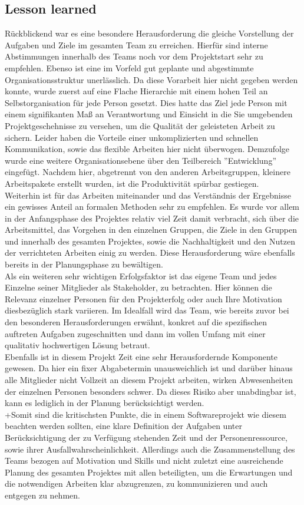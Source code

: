 \documentclass[12pt,a4paper]{article}
\begin{document}
\subsection{Lesson learned}
Rückblickend war es eine besondere Herausforderung die gleiche Vorstellung der Aufgaben und Ziele im gesamten Team zu erreichen. Hierfür sind interne Abstimmungen innerhalb des Teams noch vor dem Projektstart sehr zu empfehlen. Ebenso ist eine im Vorfeld gut geplante und abgestimmte Organisationsstruktur unerlässlich. Da diese Vorarbeit hier nicht gegeben werden konnte, wurde zuerst auf eine Flache Hierarchie mit einem hohen Teil an Selbstorganisation für jede Person gesetzt. Dies hatte das Ziel jede Person mit einem signifikanten Maß an Verantwortung und Einsicht in die Sie umgebenden Projektgeschehnisse zu versehen, um die Qualität der geleisteten Arbeit zu sichern. Leider haben die Vorteile einer unkomplizierten und schnellen Kommunikation, sowie das flexible Arbeiten hier nicht überwogen. Demzufolge wurde eine weitere Organisationsebene über den Teilbereich ''Entwicklung'' eingefügt. Nachdem hier, abgetrennt von den anderen Arbeitsgruppen, kleinere Arbeitspakete erstellt wurden, ist die Produktivität spürbar gestiegen. \\
Weiterhin ist für das Arbeiten miteinander und das Verständnis der Ergebnisse ein gewisses Anteil an formalen Methoden sehr zu empfehlen. Es wurde vor allem in der Anfangsphase des Projektes relativ viel Zeit damit verbracht, sich über die Arbeitsmittel, das Vorgehen in den einzelnen Gruppen, die Ziele in den Gruppen und innerhalb des gesamten Projektes, sowie die Nachhaltigkeit und den Nutzen der verrichteten Arbeiten einig zu werden. Diese Herausforderung wäre ebenfalls bereits in der Planungsphase zu bewältigen.\\
Als ein weiteren sehr wichtigen Erfolgsfaktor ist das eigene Team und jedes Einzelne seiner Mitglieder als Stakeholder, zu betrachten. Hier können die Relevanz einzelner Personen für den Projekterfolg oder auch Ihre Motivation diesbezüglich stark variieren. Im Idealfall wird das Team, wie bereits zuvor bei den besonderen Herausforderungen erwähnt, konkret auf die spezifischen auftreten Aufgaben zugeschnitten und dann im vollen Umfang mit einer qualitativ hochwertigen Lösung betraut.\\
Ebenfalls ist in diesem Projekt Zeit eine sehr Herausfordernde Komponente gewesen. Da hier ein fixer Abgabetermin unausweichlich ist und darüber hinaus alle Mitglieder nicht Vollzeit an diesem Projekt arbeiten, wirken Abwesenheiten der einzelnen Personen besonders schwer. Da dieses Risiko aber unabdingbar ist, kann es lediglich in der Planung berücksichtigt werden.\\
+Somit sind die kritischsten Punkte, die in einem Softwareprojekt wie diesem beachten werden sollten, eine klare Definition der Aufgaben unter Berücksichtigung der zu Verfügung stehenden Zeit und der Personenressource, sowie ihrer Ausfallwahrscheinlichkeit. Allerdings auch die Zusammenstellung des Teams bezogen auf Motivation und Skills und nicht zuletzt eine ausreichende Planung des gesamten Projektes mit allen beteiligten, um die Erwartungen und die notwendigen Arbeiten klar abzugrenzen, zu kommunizieren und auch entgegen zu nehmen.
\newpage
\end{document}
